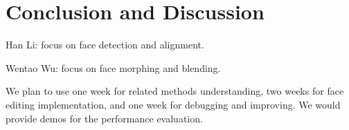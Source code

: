 \documentclass[10pt,letterpaper]{article}
\begin{document}
 
\section{Conclusion and Discussion}
 

Han Li: focus on face detection and alignment.

Wentao Wu: focus on face morphing and blending.

We plan to use one week for related methods understanding, two weeks for face editing implementation, and one week for debugging and improving. We would provide demos for the performance evaluation.

\clearpage

{\small


}
\end{document}
